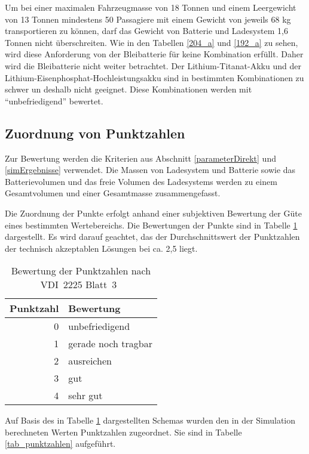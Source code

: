 Um bei einer maximalen Fahrzeugmasse von 18 Tonnen und einem Leergewicht von 13 Tonnen mindestens 50 Passagiere mit einem Gewicht von jeweils 68 kg transportieren zu können, darf das Gewicht von Batterie und Ladesystem 1,6 Tonnen nicht überschreiten. Wie in den Tabellen \ref{204_a} und \ref{192_a} zu sehen, wird diese Anforderung von der Bleibatterie für keine Kombination erfüllt. Daher wird die Bleibatterie nicht weiter betrachtet. Der Lithium-Titanat-Akku und der Lithium-Eisenphosphat-Hochleistungsakku sind in bestimmten Kombinationen zu schwer un deshalb nicht geeignet. Diese Kombinationen werden mit "`unbefriedigend"' bewertet.

\subsection{Zuordnung von Punktzahlen}
Zur Bewertung werden die Kriterien aus Abschnitt \ref{parameterDirekt} und \ref{simErgebnisse} verwendet. Die Massen von Ladesystem und Batterie sowie das Batterievolumen und das freie Volumen des Ladesystems werden zu einem Gesamtvolumen und einer Gesamtmasse zusammengefasst.

Die Zuordnung der Punkte erfolgt anhand einer subjektiven Bewertung der Güte eines bestimmten Wertebereichs. Die Bewertungen der Punkte sind in Tabelle \ref{tabPunkte} dargestellt. Es wird darauf geachtet, das der Durchschnittswert der Punktzahlen der technisch akzeptablen Lösungen bei ca. 2,5 liegt.

\begin{table} \centering
	\begin{tabular}{rl}
		\toprule
		Punktzahl & Bewertung           \\ \midrule
		        0 & unbefriedigend      \\
		        1 & gerade noch tragbar \\
		        2 & ausreichen          \\
		        3 & gut                 \\
		        4 & sehr gut            \\ \bottomrule
	\end{tabular}
	\caption[Bewertung der Punktzahlen]{Bewertung der Punktzahlen nach VDI~2225 Blatt~3~\cite[S. 5]{vdi:2225}}
	\label{tabPunkte}
\end{table}

Auf Basis des in Tabelle \ref{tabPunkte} dargestellten Schemas wurden den in der Simulation berechneten Werten Punktzahlen zugeordnet. Sie sind in Tabelle \ref{tab_punktzahlen} aufgeführt.

